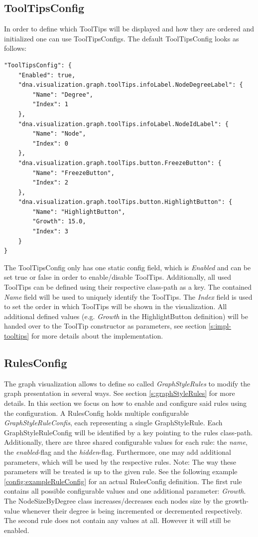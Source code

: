 \subsection{ToolTipsConfig}
\label{ss:toolTipsConfig}
In order to define which ToolTips will be displayed and how they are ordered and initialized one can use ToolTipsConfigs. The default ToolTipsConfig looks as follows:
\begin{lstlisting}
"ToolTipsConfig": {
	"Enabled": true,
	"dna.visualization.graph.toolTips.infoLabel.NodeDegreeLabel": {
		"Name": "Degree",
		"Index": 1
	},
	"dna.visualization.graph.toolTips.infoLabel.NodeIdLabel": {
		"Name": "Node",
		"Index": 0
	},
	"dna.visualization.graph.toolTips.button.FreezeButton": {
		"Name": "FreezeButton",
		"Index": 2
	},
	"dna.visualization.graph.toolTips.button.HighlightButton": {
		"Name": "HighlightButton",
		"Growth": 15.0,
		"Index": 3
	}
}
\end{lstlisting}
The ToolTipsConfig only has one static config field, which is \emph{Enabled} and can be set true or false in order to enable/disable ToolTips. Additionally, all used ToolTips can be defined using their respective class-path as a key. The contained \emph{Name} field will be used to uniquely identify the ToolTips. The \emph{Index} field is used to set the order in which ToolTips will be shown in the visualization. All additional defined values (e.g. \emph{Growth} in the HighlightButton definition) will be handed over to the ToolTip constructor as parameters, see section \ref{s:impl-tooltips} for more details about the implementation.


\subsection{RulesConfig}
\label{ss:rulesConfig}
The graph visualization allows to define so called \emph{GraphStyleRules} to modify the graph presentation in several ways. See section \ref{s:graphStyleRules} for more details. In this section we focus on how to enable and configure said rules using the configuration. A RulesConfig holds multiple configurable \emph{GraphStyleRuleConfis}, each representing a single GraphStyleRule. Each GraphStyleRuleConfig will be identified by a key pointing to the rules class-path. Additionally, there are three shared configurable values for each rule: the \emph{name}, the \emph{enabled}-flag and the \emph{hidden}-flag. Furthermore, one may add additional parameters, which will be used by the respective rules. Note: The way these parameters will be treated is up to the given rule. See the following example \ref{config:exampleRuleConfig} for an actual RulesConfig definition. The first rule contains all possible configurable values and one additional parameter: \emph{Growth}. The NodeSizeByDegree class increases/decreases each nodes size by the growth-value whenever their degree is being incremented or decremented respectively. The second rule does not contain any values at all. However it will still be enabled.

